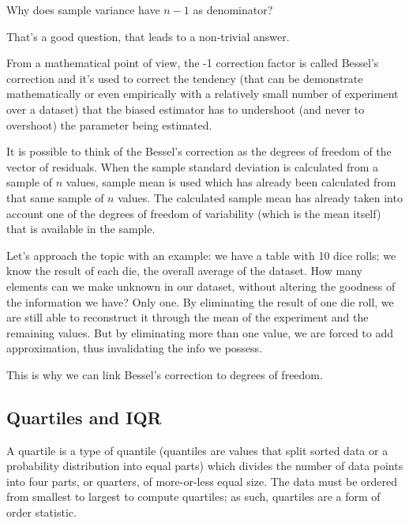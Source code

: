 \documentclass{article}
\begin{document}
Why does sample variance have $n-1$ as denominator?

That’s a good question, that leads to a non-trivial answer. 

From a mathematical point of view, the -1 correction factor is called Bessel’s correction and it’s used to correct the tendency (that can be demonstrate mathematically or even empirically with a relatively small number of experiment over a dataset) that the biased estimator has to undershoot (and never to overshoot) the parameter being estimated.  

It is possible to think of the Bessel's correction as the degrees of freedom of the vector of residuals. When the sample standard deviation is calculated from a sample of $n$ values, sample mean is used which has already been calculated from that same sample of $n$ values. The calculated sample mean has already taken into account one of the degrees of freedom of variability (which is the mean itself) that is available in the sample.

Let's approach the topic with an example: we have a table with 10 dice rolls; we know the result of each die, the overall average of the dataset.
How many elements can we make unknown in our dataset, without altering the goodness of the information we have?
Only one. By eliminating the result of one die roll, we are still able to reconstruct it through the mean of the experiment and the remaining values.
But by eliminating more than one value, we are forced to add approximation, thus invalidating the info we possess.

This is why we can link Bessel's correction to degrees of freedom. 

\subsection{Quartiles and IQR}
A quartile is a type of quantile (quantiles are values that split sorted data or a probability distribution into equal parts) which divides the number of data points into four parts, or quarters, of more-or-less equal size. The data must be ordered from smallest to largest to compute quartiles; as such, quartiles are a form of order statistic. 
\end{document}
